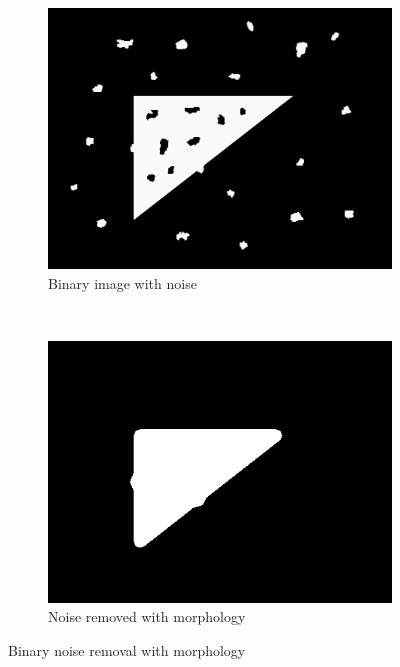 \documentclass[]{article}
\begin{document}
\begin{figure}[H]
    \centering
    \begin{subfigure}{0.5\textwidth}
        \centering
        \includegraphics[width=\textwidth]{img/before/noisy}
        \caption{Binary image with noise}
        \label{fig:bin_before}
    \end{subfigure}%
    ~
    \begin{subfigure}{0.5\textwidth}
        \centering
        \includegraphics[width=\textwidth]{img/noisy-filtered}
        \caption{Noise removed with morphology}
        \label{fig:bin_after}
    \end{subfigure}%
    \caption{Binary noise removal with morphology}
    \label{fig:binary_morph}
\end{figure}
\end{document}

